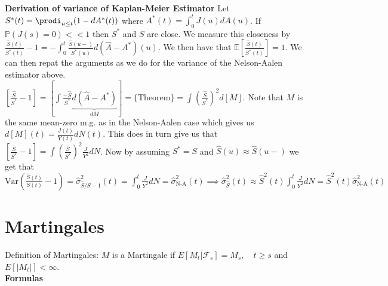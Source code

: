 \documentclass{article}
\begin{document}
\medskip

\textbf{Derivation of variance of Kaplan-Meier Estimator} 
Let $S^*(t) = \prodi_{u\leq t} (1-dA^*(t))$ where $A^*(t) = \int_0^t J(u)dA(u)$. If $\mathbb{P}(J(s) = 0) << 1$ then $S^*$ and $S$ are close. We measure this closeness by $\frac{\hat{S}(t)}{S^*(t)} - 1 = -\int_0^t \frac{\hat{S}(u-)}{S^*(u)}d(\hat{A} - A^*)(u)$. We then have that $\mathbb{E}\left[\frac{\hat{S}(t)}{S^*(t)}\right] = 1$. We can then repat the arguments as we do for the variance of the Nelson-Aalen estimator above. $\left[\frac{\hat{S}}{S^*} - 1\right] = \left[\int \frac{-\hat{S}}{S^*}\underbrace{d(\hat{A} - A^*)}_{dM}\right] = \{\text{Theorem}\} = \int \left(\frac{\hat{S}}{S^*}\right)^2d[M]$. Note that $M$ is the same mean-zero m.g. as in the Nelson-Aalen case which gives us $d[M](t)=\frac{J(t)}{Y(t)}dN(t)$. This does in turn give us that $\left[\frac{\hat{S}}{S^*}-1\right] = \int \left(\frac{\hat{S}}{S^*}\right)^2 \frac{J}{Y^2}dN$. Now by assuming $S^* = S$ and $\hat{S}(u) \approx \hat{S}(u-)$ we get that $\text{Var}\left(\frac{\hat{S}(t)}{S(t)} - 1\right) = \hat\sigma^2_{\hat{S}/S- 1}(t) = \int_0^t \frac{J}{Y^2}dN = \hat\sigma^2_{\text{N-A}}(t) \implies \hat\sigma^2_{\hat{S}}(t) \approx \hat{S}^2(t)\int_0^t \frac{J}{Y^2}dN = \hat{S}^2(t)\hat\sigma^2_{\text{N-A}}(t)$

\newpage

\section*{Martingales}

Definition of Martingales: $M$ is a Martingale if $E[M_t | \mathcal{F}_{s}] = M_s, \quad t\geq s$ and $E[|M_t|] < \infty$. \\
\textbf{Formulas} 
\end{document}
